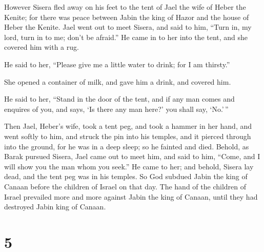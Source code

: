  However Sisera fled away on his feet to the tent of Jael
the wife of Heber the Kenite; for there was peace between Jabin the king
of Hazor and the house of Heber the Kenite.  Jael went
out to meet Sisera, and said to him, ``Turn in, my lord, turn in to me;
don't be afraid.'' He came in to her into the tent, and she covered him
with a rug.

 He said to her, ``Please give me a little water to
drink; for I am thirsty.''

She opened a container of milk, and gave him a drink, and covered him.

 He said to her, ``Stand in the door of the tent, and if
any man comes and enquires of you, and says, `Is there any man here?'
you shall say, `No.'\,''

 Then Jael, Heber's wife, took a tent peg, and took a
hammer in her hand, and went softly to him, and struck the pin into his
temples, and it pierced through into the ground, for he was in a deep
sleep; so he fainted and died.  Behold, as Barak pursued
Sisera, Jael came out to meet him, and said to him, ``Come, and I will
show you the man whom you seek.'' He came to her; and behold, Sisera lay
dead, and the tent peg was in his temples.  So God
subdued Jabin the king of Canaan before the children of Israel on that
day.  The hand of the children of Israel prevailed more
and more against Jabin the king of Canaan, until they had destroyed
Jabin king of Canaan.

\hypertarget{section-4}{%
\section{5}\label{section-4}}


